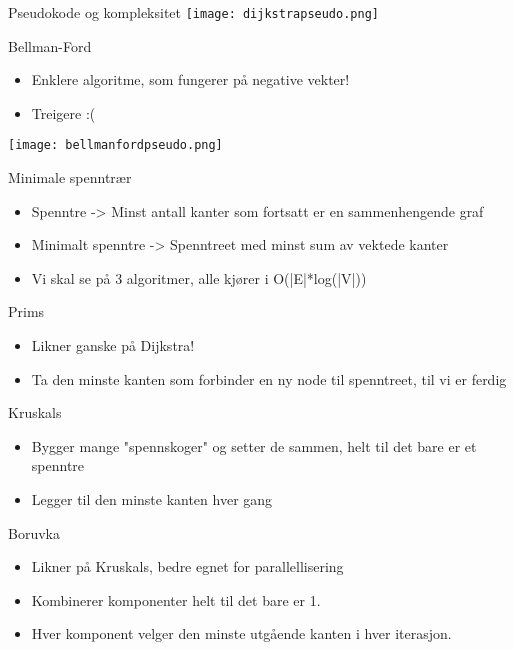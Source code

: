 \documentclass[norsk]{beamer}
\begin{document}
	\begin{frame}{Pseudokode og kompleksitet}
		\texttt{[image: dijkstrapseudo.png]}
	\end{frame}

	\begin{frame}{Bellman-Ford}
		\begin{itemize}
			\item Enklere algoritme, som fungerer på negative vekter!
			\item Treigere :(
		\end{itemize}
		\texttt{[image: bellmanfordpseudo.png]}
	\end{frame}

	\begin{frame}{Minimale spenntrær}
		\begin{itemize}
			\item Spenntre -> Minst antall kanter som fortsatt er en sammenhengende graf
			\item Minimalt spenntre -> Spenntreet med minst sum av vektede kanter
			\item Vi skal se på 3 algoritmer, alle kjører i O(|E|*log(|V|))
		\end{itemize}
	\end{frame}

	\begin{frame}{Prims}
		\begin{itemize}
			\item Likner ganske på Dijkstra!
			\item Ta den minste kanten som forbinder en ny node til spenntreet, til vi er
				ferdig
		\end{itemize}
	\end{frame}

	\begin{frame}{Kruskals}
		\begin{itemize}
			\item Bygger mange "spennskoger" og setter de sammen, helt til det bare er et
				spenntre
			\item Legger til den minste kanten hver gang
		\end{itemize}
	\end{frame}

	\begin{frame}{Boruvka}

	\begin{itemize}
		\item Likner på Kruskals, bedre egnet for parallellisering
		\item Kombinerer komponenter helt til det bare er 1.
		\item Hver komponent velger den minste utgående kanten i hver iterasjon.
	\end{itemize}

	\end{frame}
\end{document}
